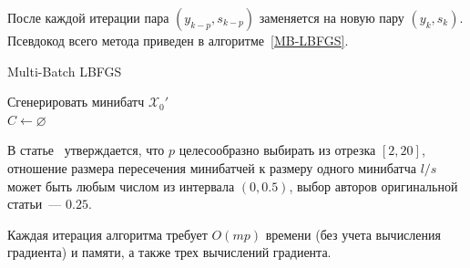 \documentclass[preprint,12pt]{elsarticle}
\begin{document}
{После каждой итерации пара $(y_{k - p}, s_{k - p})$ заменяется на новую пару $(y_k, s_k)$. 
Псевдокод всего метода приведен в алгоритме~\ref{MB-LBFGS}.\\
\begin{algorithm}[H]\label{MB-LBFGS}
\caption {Multi-Batch LBFGS}
\SetAlgoLined
{}
 Сгенерировать минибатч $\mathcal{X}_0'$\\
 $C \leftarrow \varnothing$\\
\end{algorithm}
В статье~\cite{multibatchLBFGS} утверждается, что $p$ целесообразно выбирать из отрезка $[2, 20]$, отношение размера пересечения минибатчей к размеру одного минибатча $l/s$ может быть любым числом из интервала $(0, 0.5)$, выбор авторов оригинальной статьи~--- $0.25$. 

Каждая итерация алгоритма требует $O(mp)$ времени (без учета вычисления градиента) и памяти, а также трех вычислений градиента.

}
\end{document}
